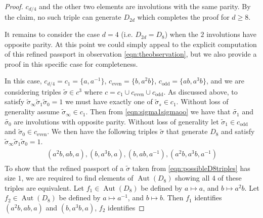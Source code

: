 \documentclass{dcthesis}
\newcommand{\wt}[1]{\widetilde{#1}}
\DeclareMathOperator{\Aut}{Aut}
\numberwithin{equation}{section}
\theoremstyle{definition}
\theoremstyle{remark}
\begin{document}
{{{\begin{proof}
      $c_{d/4}$
      and the other two elements
      are involutions with the same parity.
      By the claim,
      no such triple can generate $D_{2d}$
      which completes the proof for
      $d\geq 8$.
      \par
      It remains to consider the case
      $d=4$ (i.e. $D_{2d} = D_8$)
      when the $2$ involutions have
      opposite parity.
      At this point we could simply appeal
      to the explicit computation of
      this refined passport in observation
      \eqref{eqn:theobservation},
      but we also provide a proof in
      this specific case for completeness.
      \par
      In this case,
      $c_{d/4} = c_1=\{a,a^{-1}\}$,
      $c_\text{even}=\{b,a^2b\}$,
      $c_\text{odd}=\{ab,a^3b\}$,
      and we are considering triples
      $\wt{\sigma}\in
      c^3$
      where $c=c_1\cup c_\text{even}
      \cup c_\text{odd}$.
      As discussed above,
      to satisfy $\wt{\sigma}_\infty
      \wt{\sigma}_1\wt{\sigma}_0=1$
      we must have exactly one of
      $\wt{\sigma}_s\in c_1$.
      Without loss of generality assume
      $\wt{\sigma}_\infty\in c_1$.
      Then from \eqref{eqn:sigma1sigmaoo}
      we have that $\wt{\sigma_1}$
      and $\wt{\sigma_0}$ are involutions with
      opposite parity.
      Without loss of generality let
      $\wt{\sigma}_1\in c_\text{odd}$
      and $\wt{\sigma}_0\in c_\text{even}$.
      We then have the following triples
      $\wt{\sigma}$ that generate
      $D_8$ and satisfy
      $\wt{\sigma}_\infty\wt{\sigma}_1
      \wt{\sigma}_0=1$.
      \begin{align}
        \label{eqn:possibleD8triples}
        \begin{split}
          (a^2b,ab,a),
          (b,a^3b,a),
          (b,ab,a^{-1}),
          (a^2b,a^3b,a^{-1})
        \end{split}
      \end{align}
      To show that the refined passport
      of a $\wt{\sigma}$ taken from
      \eqref{eqn:possibleD8triples}
      has size $1$,
      we are required to find elements of
      $\Aut(D_8)$
      showing all $4$ of these triples are
      equivalent.
      Let $f_1\in\Aut(D_8)$ be defined by
      $a\mapsto a$, and
      $b\mapsto a^2b$.
      Let $f_2\in\Aut(D_8)$ be defined by
      $a\mapsto a^{-1}$, and
      $b\mapsto b$.
      Then $f_1$ identifies
      $(a^2b,ab,a)$
      and
      $(b,a^3b,a)$,
      $f_2$ identifies

\end{proof}}}}
\end{document}
